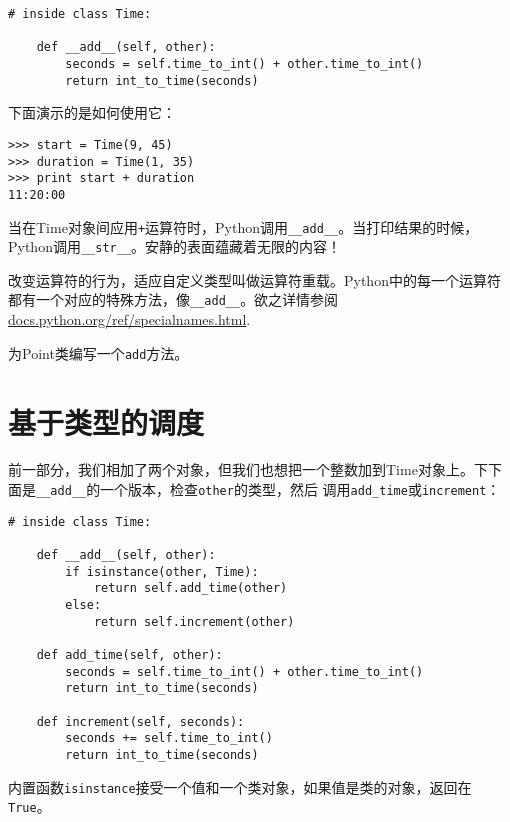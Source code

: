 
\beforeverb
\begin{verbatim}
# inside class Time:

    def __add__(self, other):
        seconds = self.time_to_int() + other.time_to_int()
        return int_to_time(seconds)
\end{verbatim}
\afterverb

下面演示的是如何使用它：

\beforeverb
\begin{verbatim}
>>> start = Time(9, 45)
>>> duration = Time(1, 35)
>>> print start + duration
11:20:00
\end{verbatim}
\afterverb

当在Time对象间应用{\tt +}运算符时，Python调用\verb"__add__"。当打印结果的时候，Python调用\verb"__str__"。安静的表面蕴藏着无限的内容！


改变运算符的行为，适应自定义类型叫做运算符重载。Python中的每一个运算符都有一个对应的特殊方法，像\verb"__add__"。欲之详情参阅\url{docs.python.org/ref/specialnames.html}.

\begin{ex}
为Point类编写一个{\tt add}方法。
\end{ex}

\section{基于类型的调度}

前一部分，我们相加了两个对象，但我们也想把一个整数加到Time对象上。下下面是\verb"__add__"的一个版本，检查{\tt other}的类型，然后
调用\verb"add_time"或{\tt increment}：

\beforeverb
\begin{verbatim}
# inside class Time:

    def __add__(self, other):
        if isinstance(other, Time):
            return self.add_time(other)
        else:
            return self.increment(other)

    def add_time(self, other):
        seconds = self.time_to_int() + other.time_to_int()
        return int_to_time(seconds)

    def increment(self, seconds):
        seconds += self.time_to_int()
        return int_to_time(seconds)
\end{verbatim}
\afterverb

内置函数{\tt isinstance}接受一个值和一个类对象，如果值是类的对象，返回在{\tt True}。

